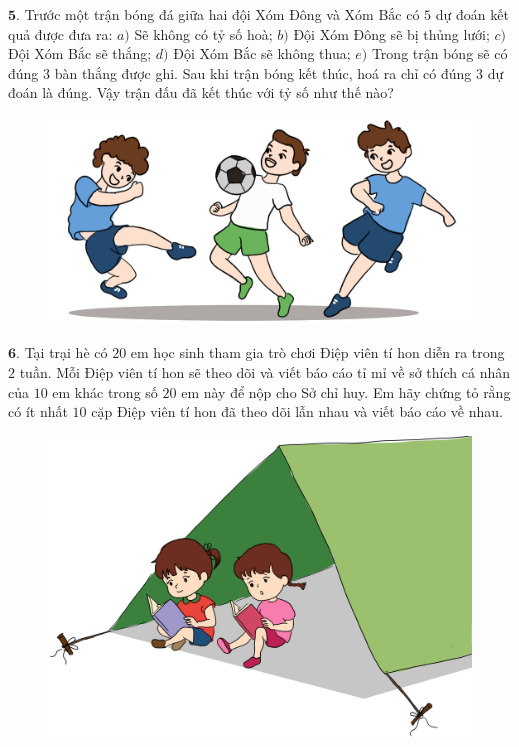 \begin{multicols}{2}
\begin{figure}[H]
		\vspace*{-10pt}
	\end{figure}
	$\pmb{5.}$ Trước một trận bóng đá giữa hai đội Xóm Đông và Xóm Bắc có $5$ dự đoán kết quả được đưa ra:
	\vskip 0.1cm
	$a)$	Sẽ không có tỷ số hoà;
	\vskip 0.1cm
	$b)$	Đội Xóm Đông sẽ bị thủng lưới;
	\vskip 0.1cm
	$c)$	Đội Xóm Bắc sẽ thắng;
	\vskip 0.1cm
	$d)$	Đội Xóm Bắc sẽ không thua;
	\vskip 0.1cm
	$e)$	Trong trận bóng sẽ có đúng 3 bàn thắng được ghi.
	\vskip 0.1cm
	Sau khi trận bóng kết thúc, hoá ra chỉ có đúng $3$ dự đoán là đúng. Vậy trận đấu đã kết thúc với tỷ số như thế nào?
	\begin{figure}[H]
		\centering
		\vspace*{-5pt}
		\captionsetup{labelformat= empty, justification=centering}
		\includegraphics[width=1\linewidth]{Pi7_bai5}
		\vspace*{-15pt}
	\end{figure}
	$\pmb{6.}$ 	Tại trại hè có $20$ em học sinh tham gia trò chơi Điệp viên tí hon diễn ra trong $2$ tuần. Mỗi Điệp viên tí hon sẽ theo dõi và viết báo cáo tỉ mỉ về sở thích cá nhân của $10$ em khác trong số $20$ em này để nộp cho Sở chỉ huy. Em hãy chứng tỏ rằng có ít nhất $10$ cặp Điệp viên tí hon đã theo dõi lẫn nhau và viết báo cáo về nhau.
	\begin{figure}[H]
		\centering
		\vspace*{-5pt}
		\captionsetup{labelformat= empty, justification=centering}
		\includegraphics[width=1\linewidth]{Pi7_bai6}
		\vspace*{-5pt}
	\end{figure}
\end{multicols}
